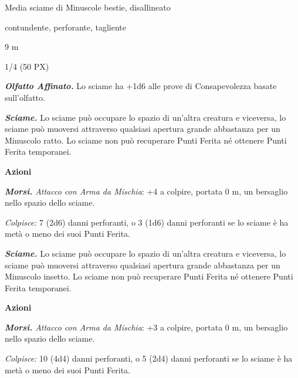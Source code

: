 \begin{multicols}{2}
{
\begin{description}[noitemsep, topsep=0pt, parsep=0pt, partopsep=0pt, itemsep=1pt, leftmargin=2.35cm,  labelwidth=2.2cm, itemindent=0cm, listparindent=0pt] %
\setlength{\baselineskip}{10pt}
\item[\textbf{Taglia/Tipo}] Media sciame di Minuscole bestie, disallineato
\item[\textbf{Caratt.}] 
\item[\textbf{Punti Ferita}] 
\item[\textbf{Resistenze al danno}] contundente, perforante, tagliente
\item[\textbf{Tiri Salvez.}] 
\item[\textbf{Movimento}] 9 m
\item[\textbf{Sfida}] 1/4 (50 PX)
\end{description}
\smallskip

\emph{\textbf{Olfatto Affinato.}} Lo sciame ha +1d6 alle prove di Consapevolezza basate sull'olfatto.

\emph{\textbf{Sciame.}} Lo sciame può occupare lo spazio di un'altra creatura e viceversa, lo sciame può muoversi attraverso qualsiasi apertura grande abbastanza per un Minuscolo ratto. Lo sciame non può recuperare Punti Ferita né ottenere Punti Ferita temporanei.

\textbf{Azioni}

\emph{\textbf{Morsi.} Attacco con Arma da Mischia}: +4 a colpire, portata 0 m, un bersaglio nello spazio dello sciame.

\emph{Colpisce:} 7 (2d6) danni perforanti, o 3 (1d6) danni perforanti se lo sciame è ha metà o meno dei suoi Punti Ferita.

\emph{\textbf{Sciame.}} Lo sciame può occupare lo spazio di un'altra creatura e viceversa, lo sciame può muoversi attraverso qualsiasi apertura grande abbastanza per un Minuscolo insetto. Lo sciame non può recuperare Punti Ferita né ottenere Punti Ferita temporanei.

\textbf{Azioni}

\emph{\textbf{Morsi.} Attacco con Arma da Mischia}: +3 a colpire, portata 0 m, un bersaglio nello spazio dello sciame.

\emph{Colpisce:} 10 (4d4) danni perforanti, o 5 (2d4) danni perforanti se lo sciame è ha metà o meno dei suoi Punti Ferita.

}
\end{multicols}
